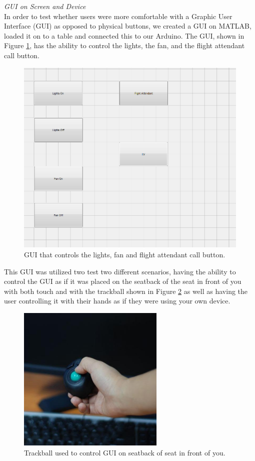 \emph{GUI on Screen and Device}\\
In order to test whether users were more comfortable with a Graphic User Interface (GUI) as opposed to physical buttons, we created a GUI on MATLAB, loaded it on to a table and connected this to our Arduino. The GUI, shown in Figure \ref{fig:MATLABGUI.jpg}, has the ability to control the lights, the fan, and the flight attendant call button.

\begin{figure}[h]
  \centering
     \includegraphics[width=12cm]{images/MATLABGUI.jpg}
   \caption{ GUI that controls the lights, fan and flight attendant call button. }
  \label{fig:MATLABGUI.jpg}
\end{figure}

This GUI was utilized two test two different scenarios, having the ability to control the GUI as if it was placed on the seatback of the seat in front of you with both touch and with the trackball shown in Figure \ref{fig:Trackball.jpg} as well as having the user controlling it with their hands as if they were using your own device. 

\begin{figure}[h]
  \centering
     \includegraphics[width=7cm]{images/Trackball.jpg}
   \caption{ Trackball used to control GUI on seatback of seat in front of you. }
  \label{fig:Trackball.jpg}
\end{figure}


